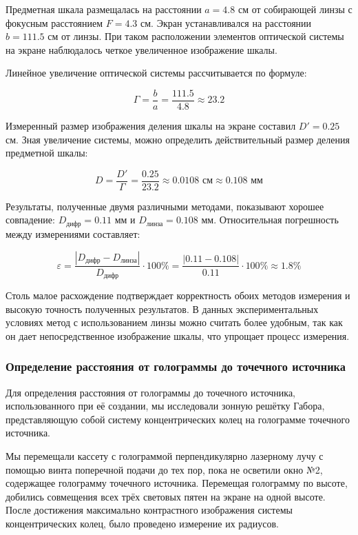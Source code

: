 Предметная шкала размещалась на расстоянии $a = 4.8$ см от собирающей линзы с фокусным расстоянием $F = 4.3$ см. Экран устанавливался на расстоянии $b = 111.5$ см от линзы. При таком расположении элементов оптической системы на экране наблюдалось четкое увеличенное изображение шкалы.

Линейное увеличение оптической системы рассчитывается по формуле:

\begin{equation}
    \Gamma = \frac{b}{a} = \frac{111.5}{4.8} \approx 23.2
\end{equation}

Измеренный размер изображения деления шкалы на экране составил $D' = 0.25$ см. Зная увеличение системы, можно определить действительный размер деления предметной шкалы:

\begin{equation}
    D = \frac{D'}{\Gamma} = \frac{0.25}{23.2} \approx 0.0108 \text{ см} \approx 0.108 \text{ мм}
\end{equation}

Результаты, полученные двумя различными методами, показывают хорошее совпадение: $D_{\text{дифр}} = 0.11$ мм и $D_{\text{линза}} = 0.108$ мм. Относительная погрешность между измерениями составляет:

\begin{equation}
    \varepsilon = \frac{|D_{\text{дифр}} - D_{\text{линза}}|}{D_{\text{дифр}}} \cdot 100\% = \frac{|0.11 - 0.108|}{0.11} \cdot 100\% \approx 1.8\%
\end{equation}

Столь малое расхождение подтверждает корректность обоих методов измерения и высокую точность полученных результатов. В данных экспериментальных условиях метод с использованием линзы можно считать более удобным, так как он дает непосредственное изображение шкалы, что упрощает процесс измерения.

\subsubsection{Определение расстояния от голограммы до точечного источника}

Для определения расстояния от голограммы до точечного источника, использованного при её создании, мы исследовали зонную решётку Габора, представляющую собой систему концентрических колец на голограмме точечного источника.

Мы перемещали кассету с голограммой перпендикулярно лазерному лучу с помощью винта поперечной подачи до тех пор, пока не осветили окно №2, содержащее голограмму точечного источника. Перемещая голограмму по высоте, добились совмещения всех трёх световых пятен на экране на одной высоте. После достижения максимально контрастного изображения системы концентрических колец, было проведено измерение их радиусов.

